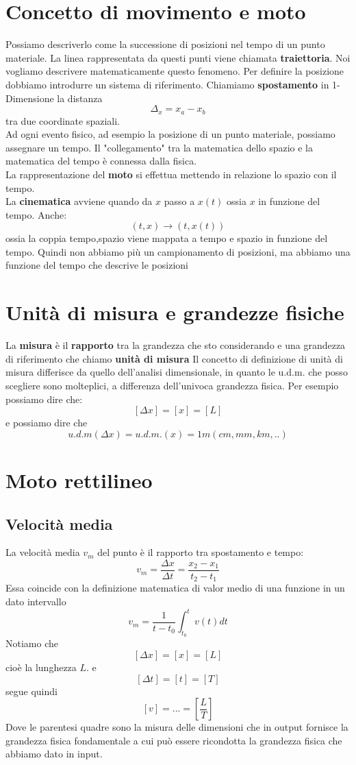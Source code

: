 \documentclass[a4paper]{report}
\begin{document}
  \section{Concetto di movimento e moto}
  Possiamo descriverlo come la successione di posizioni nel tempo di un punto materiale. La linea rappresentata da questi punti viene chiamata \textbf{traiettoria}. Noi vogliamo descrivere matematicamente questo fenomeno.
  Per definire la posizione dobbiamo introdurre un sistema di riferimento.
  Chiamiamo \textbf{spostamento} in 1-Dimensione la distanza $$\Delta_x = x_a -x_b$$ tra due coordinate spaziali.\\
  Ad ogni evento fisico, ad esempio la posizione di un punto materiale, possiamo assegnare un tempo. Il "collegamento" tra la matematica dello spazio e la matematica del tempo è connessa dalla fisica.\\
  La rappresentazione del \textbf{moto} si effettua mettendo in relazione lo spazio con il tempo.\\
  La \textbf{cinematica} avviene quando da $x$ passo a $x(t)$ ossia $x$ in funzione del tempo. Anche: $$(t,x) \rightarrow (t, x(t))$$ ossia la coppia tempo,spazio viene mappata a tempo e spazio in funzione del tempo. Quindi non abbiamo più un campionamento di posizioni, ma abbiamo una funzione del tempo che descrive le posizioni

  \section{Unità di misura e grandezze fisiche}
  La \textbf{misura} è il \textbf{rapporto} tra la grandezza che sto considerando e una grandezza di riferimento che chiamo \textbf{unità di misura}
  Il concetto di definizione di unità di misura differisce da quello dell'analisi dimensionale, in quanto le u.d.m. che posso scegliere sono molteplici, a differenza dell'univoca grandezza fisica.
  Per esempio possiamo dire che:
  $$[\Delta x] = [x] = [L]$$
  e possiamo dire che
  $$u.d.m(\Delta x) = u.d.m.(x) = 1m (cm, mm, km, ..)$$

  \section{Moto rettilineo}
  \subsection{Velocità media}
  La velocità media $v_m$ del punto è il rapporto tra spostamento e tempo:
  $$ v_m = \frac{\Delta x}{\Delta t} = \frac{x_2 - x_1}{t_2 - t_1} $$
  Essa coincide con la definizione matematica di valor medio di una funzione in un dato intervallo
  $$ v_m = \frac{1}{t-t_0} \int_{t_0}^t v(t) dt $$
  Notiamo che $$[\Delta x] = [x] = [L]$$ cioè la lunghezza $L$. e \\
  $$ [\Delta t] = [t] = [T]$$ segue quindi
  $$ [v] = ... = [\frac{L}{T}]$$
  Dove le parentesi quadre sono la misura delle dimensioni che in output fornisce la grandezza fisica fondamentale a cui può essere ricondotta la grandezza fisica che abbiamo dato in input.
\end{document}
